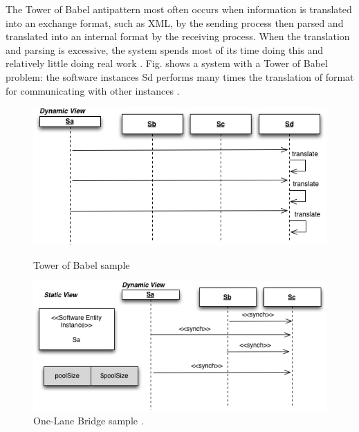 \documentclass{report}
\begin{document}
The Tower of Babel antipattern most often occurs when information is translated into an exchange format, such as XML, by the sending process then parsed and translated into an
internal format by the receiving process. When the translation and parsing is excessive, the system spends most
of its time doing this and relatively little doing real work \cite{Smith2003}. Fig. shows a system with a Tower of Babel problem: the software instances Sd performs many times the translation of format for communicating with other instances \cite{Vetoio2011}.

\begin{figure}[H]
\begin{minipage}{.5\textwidth}
\centering
\includegraphics[width=1\textwidth]{./images/babel2.png}
\caption{Tower of Babel sample \cite{Vetoio2011}}
\label{fig:babel}
\end{minipage}
\begin{minipage}{.5\textwidth}
\centering
\includegraphics[width=1\textwidth]{./images/onelane.png}
\caption{One-Lane Bridge sample \cite{Vetoio2011}.}
\label{fig:onelane}
\end{minipage}
\end{figure}
\end{document}
